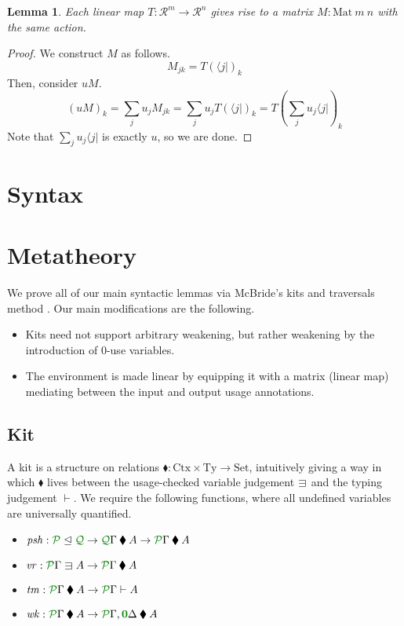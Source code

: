 \documentclass[submission,copyright,creativecommons]{eptcs}
\newtheorem{lemma}[theorem]{Lemma}
\newcommand{\kitrel}{\mathbin{\blacklozenge}}
\begin{document}
\begin{lemma}
  Each linear map $T : \mathscr R^m \to \mathscr R^n$ gives rise to a matrix
  $M : \mathrm{Mat}~m~n$ with the same action.
\end{lemma}
\begin{proof}
  We construct $M$ as follows.
  \[
    M_{jk} = T(\langle j \rvert)_k
  \]
  Then, consider $uM$.
  \[
    (uM)_k = \sum_j u_jM_{jk} = \sum_j u_jT\left(\langle j \rvert\right)_k
    = T\left(\sum_j u_j\langle j \rvert\right)_k
  \]
  Note that $\sum_j u_j\langle j \rvert$ is exactly $u$, so we are done.
\end{proof}

\section{Syntax}

\section{Metatheory}

We prove all of our main syntactic lemmas via McBride's kits and traversals
method \cite{rensub05}.
Our main modifications are the following.
\begin{itemize}
  \item Kits need not support arbitrary weakening, but rather weakening by the
    introduction of $0$-use variables.
  \item The environment is made linear by equipping it with a matrix (linear map)
    mediating between the input and output usage annotations.
\end{itemize}

\subsection{Kit}

A kit is a structure on relations
$\kitrel : \mathrm{Ctx} \times \mathrm{Ty} \to \mathrm{Set}$, intuitively
giving a way in which $\kitrel$ lives between the usage-checked variable
judgement $\lvar$ and the typing judgement $\vdash$.
We require the following functions, where all undefined variables are
universally quantified.

\begin{itemize}
  \item
    $\mathit{psh} : \resctx P \subres \resctx Q \to
    \ctx{\Gamma}{Q} \kitrel A \to \ctx{\Gamma}{P} \kitrel A$
  \item $\mathit{vr} : \ctx{\Gamma}{P} \lvar A \to
    \ctx{\Gamma}{P} \kitrel A$
  \item $\mathit{tm} : \ctx{\Gamma}{P} \kitrel A \to
    \ctx{\Gamma}{P} \vdash A$
  \item $\mathit{wk} : \ctx{\Gamma}{P} \kitrel A \to
    \ctx{\Gamma}{P}, \ctx{\Delta}{\vct 0} \kitrel A$
\end{itemize}
\end{document}
